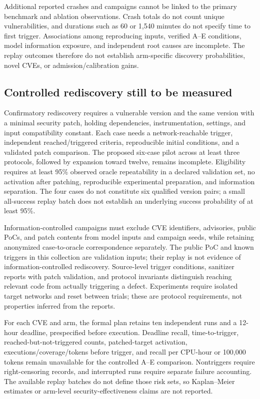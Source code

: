 \documentclass[final,5p,times,number]{elsarticle}
\begin{document}
Additional reported crashes and campaigns cannot be linked to the primary benchmark and ablation observations. Crash totals do not count unique vulnerabilities, and durations such as 60 or 1,540 minutes do not specify time to first trigger. Associations among reproducing inputs, verified A--E conditions, model information exposure, and independent root causes are incomplete. The replay outcomes therefore do not establish arm-specific discovery probabilities, novel CVEs, or admission/calibration gains.

\subsection{Controlled rediscovery still to be measured}
Confirmatory rediscovery requires a vulnerable version and the same version with a minimal security patch, holding dependencies, instrumentation, settings, and input compatibility constant. Each case needs a network-reachable trigger, independent reached/triggered criteria, reproducible initial conditions, and a validated patch comparison. The proposed six-case pilot across at least three protocols, followed by expansion toward twelve, remains incomplete. Eligibility requires at least 95\% observed oracle repeatability in a declared validation set, no activation after patching, reproducible experimental preparation, and information separation. The four cases do not constitute six qualified version pairs; a small all-success replay batch does not establish an underlying success probability of at least 95\%.

Information-controlled campaigns must exclude CVE identifiers, advisories, public PoCs, and patch contents from model inputs and campaign seeds, while retaining anonymized case-to-oracle correspondence separately. The public PoC and known triggers in this collection are validation inputs; their replay is not evidence of information-controlled rediscovery. Source-level trigger conditions, sanitizer reports with patch validation, and protocol invariants distinguish reaching relevant code from actually triggering a defect. Experiments require isolated target networks and reset between trials; these are protocol requirements, not properties inferred from the reports.

For each CVE and arm, the formal plan retains ten independent runs and a 12-hour deadline, prespecified before execution. Deadline recall, time-to-trigger, reached-but-not-triggered counts, patched-target activation, executions/coverage/tokens before trigger, and recall per CPU-hour or 100,000 tokens remain unavailable for the controlled A--E comparison. Nontriggers require right-censoring records, and interrupted runs require separate failure accounting. The available replay batches do not define those risk sets, so Kaplan--Meier estimates or arm-level security-effectiveness claims are not reported.
\end{document}
